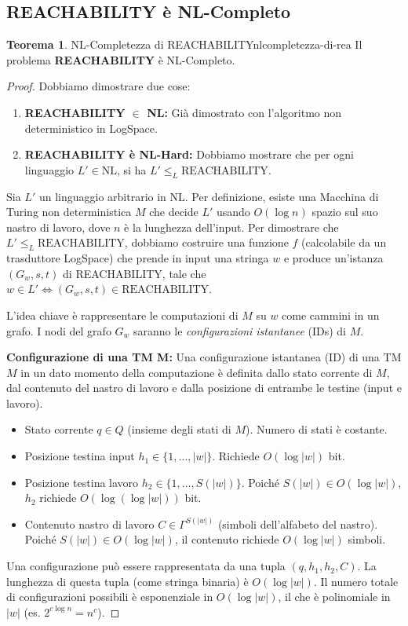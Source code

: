 \documentclass[a4paper]{article}
\theoremstyle{definition} %
\newtheorem{theorem}{Teorema}
[section]
\begin{document}
\subsection{REACHABILITY è NL-Completo}

\begin{theorem}{NL-Completezza di REACHABILITY}{nlcompletezza-di-rea}
Il problema \textbf{REACHABILITY} è NL-Completo.
\end{theorem}
\begin{proof}
Dobbiamo dimostrare due cose:
\begin{enumerate}
    \item \textbf{REACHABILITY $\in$ NL:} Già dimostrato con l'algoritmo non deterministico in LogSpace.
    \item \textbf{REACHABILITY è NL-Hard:} Dobbiamo mostrare che per ogni linguaggio $L' \in \text{NL}$, si ha $L' \le_L \text{REACHABILITY}$.
\end{enumerate}

Sia $L'$ un linguaggio arbitrario in $\text{NL}$. Per definizione, esiste una Macchina di Turing non deterministica $M$ che decide $L'$ usando $O(\log n)$ spazio sul suo nastro di lavoro, dove $n$ è la lunghezza dell'input.
Per dimostrare che $L' \le_L \text{REACHABILITY}$, dobbiamo costruire una funzione $f$ (calcolabile da un trasduttore LogSpace) che prende in input una stringa $w$ e produce un'istanza $(G_w, s, t)$ di REACHABILITY, tale che $w \in L' \iff (G_w, s, t) \in \text{REACHABILITY}$.

L'idea chiave è rappresentare le computazioni di $M$ su $w$ come cammini in un grafo. I nodi del grafo $G_w$ saranno le \emph{configurazioni istantanee} (IDs) di $M$.

\textbf{Configurazione di una TM M:} Una configurazione istantanea (ID) di una TM $M$ in un dato momento della computazione è definita dallo stato corrente di $M$, dal contenuto del nastro di lavoro e dalla posizione di entrambe le testine (input e lavoro).
\begin{itemize}
    \item Stato corrente $q \in Q$ (insieme degli stati di $M$). Numero di stati è costante.
    \item Posizione testina input $h_1 \in \{1, \dots, |w|\}$. Richiede $O(\log |w|)$ bit.
    \item Posizione testina lavoro $h_2 \in \{1, \dots, S(|w|)\}$. Poiché $S(|w|) \in O(\log |w|)$, $h_2$ richiede $O(\log(\log |w|))$ bit.
    \item Contenuto nastro di lavoro $C \in \Gamma^{S(|w|)}$ (simboli dell'alfabeto del nastro). Poiché $S(|w|) \in O(\log |w|)$, il contenuto richiede $O(\log |w|)$ simboli.
\end{itemize}
Una configurazione può essere rappresentata da una tupla $(q, h_1, h_2, C)$. La lunghezza di questa tupla (come stringa binaria) è $O(\log |w|)$.
Il numero totale di configurazioni possibili è esponenziale in $O(\log |w|)$, il che è polinomiale in $|w|$ (es. $2^{c \log n} = n^c$).


\end{proof}
\end{document}
